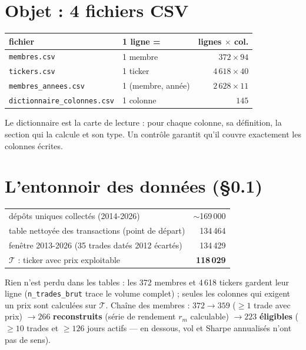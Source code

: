\documentclass[10pt,a4paper,twocolumn]{article}
\begin{document}

\section{Objet : 4 fichiers CSV}
\begin{center}\small
\begin{tabularx}{\linewidth}{@{}lXr@{}}
\toprule
fichier & 1 ligne = & lignes $\times$ col. \\
\midrule
\texttt{membres.csv} & 1 membre & $372 \times 94$ \\
\texttt{tickers.csv} & 1 ticker & $4\,618 \times 40$ \\
\texttt{membres\_annees.csv} & 1 (membre, année) & $2\,628 \times 11$ \\
\texttt{dictionnaire\_colonnes.csv} & 1 colonne & $145$ \\
\bottomrule
\end{tabularx}
\end{center}
Le dictionnaire est la carte de lecture : pour chaque colonne, sa définition, la section qui la
calcule et son type. Un contrôle garantit qu'il couvre exactement les colonnes écrites.

\section{L'entonnoir des données (\S 0.1)}
\begin{center}\small
\begin{tabularx}{\linewidth}{@{}Xr@{}}
\toprule
dépôts uniques collectés (2014-2026) & $\sim$169\,000 \\
table nettoyée des transactions (point de départ) & 134\,464 \\
fenêtre 2013-2026 (35 trades datés 2012 écartés) & 134\,429 \\
$\mathcal{T}$ : ticker avec prix exploitable & \textbf{118\,029} \\
\bottomrule
\end{tabularx}
\end{center}
Rien n'est perdu dans les tables : les 372 membres et 4\,618 tickers gardent leur ligne
(\texttt{n\_trades\_brut} trace le volume complet) ; seules les colonnes qui exigent un prix sont
calculées sur $\mathcal{T}$. Chaîne des membres :
$372 \to 359$ ($\ge 1$ trade avec prix) $\to 266$ \textbf{reconstruits} (série de rendement $r_m$
calculable) $\to 223$ \textbf{éligibles} ($\ge 10$ trades et $\ge 126$ jours actifs --- en
dessous, vol et Sharpe annualisés n'ont pas de sens).
\end{document}
